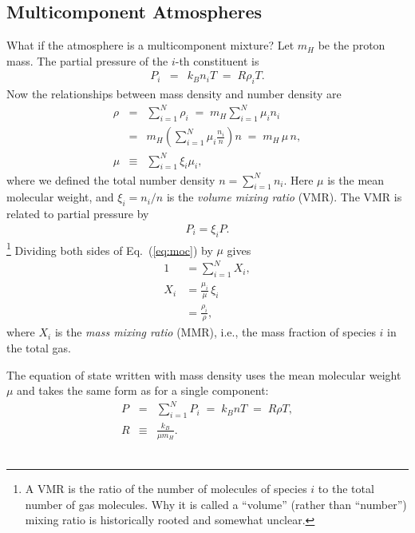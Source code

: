 \subsection*{Multicomponent Atmospheres}

What if the atmosphere is a multicomponent mixture? Let $m_H$ be the proton mass. The partial pressure of the $i$-th constituent is
\begin{eqnarray}
\label{eq:idealRpa}
P_i &=& k_B n_i T \;=\; R \rho_i T .
\end{eqnarray}
Now the relationships between mass density and number density are
\begin{eqnarray}
\label{eq:rhon}
\rho &=& \sum_{i=1}^N \rho_i \;=\; m_H \sum_{i=1}^N \mu_i n_i \\
&=& m_H \left( \sum_{i=1}^N \mu_i \frac{ n_i}{n} \right) n \;=\; m_H \, \mu \, n ,\\
\label{eq:moc}
\mu &\equiv& \sum_{i=1}^N \xi_i \mu_i ,
\end{eqnarray}
where we defined the total number density $n= \sum_{i=1}^N n_i$. Here $\mu$ is the mean molecular weight, and $\xi_i = n_i/n$ is the \emph{volume mixing ratio} (VMR). The VMR is related to partial pressure by
\begin{eqnarray}
\label{eq:partial_pressure}
P_i = \xi_i P .
\end{eqnarray}
\footnote{A VMR is the ratio of the number of molecules of species $i$ to the total number of gas molecules. Why it is called a “volume” (rather than “number”) mixing ratio is historically rooted and somewhat unclear.}
Dividing both sides of Eq.~(\ref{eq:moc}) by $\mu$ gives
\begin{align}
1 &=  \sum_{i=1}^N X_i ,\\
\label{eq:mmr_vmr}
X_i &=  \frac{\mu_i}{\mu} \, \xi_i \\
& = \frac{\rho_i}{\rho} ,
\end{align}
where $X_i$ is the \emph{mass mixing ratio} (MMR), i.e., the mass fraction of species $i$ in the total gas.

The equation of state written with mass density uses the mean molecular weight $\mu$ and takes the same form as for a single component:
\begin{eqnarray}
\label{eq:idealRpat}
P &=&  \sum_{i=1}^N P_i \;=\; k_B n T \;=\; R \rho T ,\\
R &\equiv& \frac{k_B}{\mu m_H} .
\end{eqnarray}
\\

